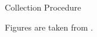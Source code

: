\documentclass[ucs,9pt]{beamer}
\begin{document}
\begin{frame}{Collection Procedure}
\begin{minipage}[c]{0.49\linewidth}
	
\end{minipage}
Figures are taken from \cite{b1}.
\end{frame}
\end{document}
